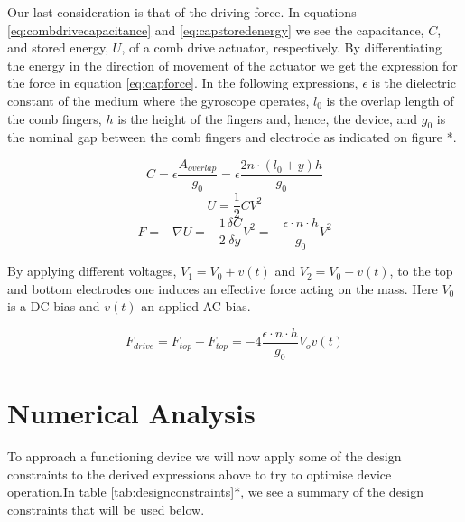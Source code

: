 \documentclass[12pt,a4paper,titlepage]{article}
\begin{document}
\begin{spacing}{1.1}
Our last consideration is that of the driving force. In equations \ref{eq:combdrivecapacitance} and \ref{eq:capstoredenergy} we see the capacitance, $C$, and stored energy, $ U $, of a comb drive actuator, respectively. By differentiating the energy in the direction of movement of the actuator we get the expression for the force in equation \ref{eq:capforce}. In the following expressions, $\epsilon$ is the dielectric constant of the medium where the gyroscope operates, $l_0$ is the overlap length of the comb fingers, $h$ is the height of the fingers and, hence, the device, and $g_0$ is the nominal gap between the comb fingers and electrode as indicated on figure *.

\begin{equation}
C = \epsilon \dfrac{A_{overlap}}{g_0} = \epsilon \dfrac{2n \cdot (l_0 +y) h  }{g_0}
\label{eq:combdrivecapacitance}
\end{equation}
\begin{equation}
U = \dfrac{1}{2} C V^2
\label{eq:capstoredenergy}
\end{equation}
\begin{equation}
F = -\nabla U = - \dfrac{1}{2} \dfrac{\delta C}{\delta y} V^2 = -\dfrac{\epsilon \cdot n  \cdot h}{g_0} V^2
\label{eq:capforce}
\end{equation}

By applying different voltages, $V_1 = V_0 + v(t)$ and $V_2 = V_0 - v(t)$, to the top and bottom electrodes one induces an effective force acting on the mass\supercite{Chang12}. Here $V_0$ is a DC bias and $v(t)$ an applied AC bias.

\begin{equation}
F_{drive} = F_{top} - F_{top} = -4\dfrac{\epsilon \cdot n  \cdot h}{g_0} V_o v(t)
\end{equation} 



\section{Numerical Analysis}
To approach a functioning device we will now apply some of the design constraints to the derived expressions above to try to optimise device operation.In table \ref{tab:designconstraints}*, we see a summary of the design constraints that will be used below.


\end{spacing}
\end{document}
